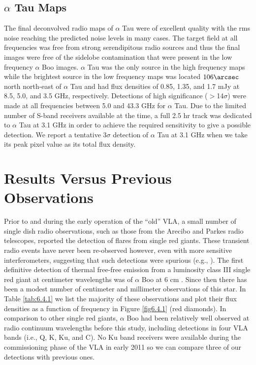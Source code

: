\subsection{$\alpha$ Tau Maps}\label{sec:6.2.2}
The final deconvolved radio maps of $\alpha$ Tau were of excellent quality with the rms noise reaching the predicted noise levels in many cases. The target field at all frequencies was free from strong serendipitous radio sources and thus the final images were free of the sidelobe contamination that were present in the low frequency $\alpha$ Boo images. $\alpha$ Tau was the only source in the high frequency maps while the brightest source in the low frequency maps was located $106\arcsec$ north north-east of $\alpha$ Tau and had flux densities of 0.85, 1.35, and 1.7 mJy at 8.5, 5.0, and 3.5 GHz, respectively. Detections of high significance ($>$14$\sigma$) were made at all frequencies between 5.0 and 43.3 GHz for $\alpha$ Tau. Due to the limited number of S-band receivers available at the time, a full 2.5 hr track was dedicated to $\alpha$ Tau at 3.1 GHz in order to achieve the required sensitivity to give a possible detection. We report a tentative $3\sigma$ detection of $\alpha$ Tau at 3.1 GHz when we take its peak pixel value as its total flux density.

\section{Results Versus Previous Observations}\label{sec:6.4}
Prior to and during the early operation of the ``old'' VLA, a small number of single dish radio observations, such as those from the Arecibo \citep{boice_1981} and Parkes \citep{slee_1989} radio telescopes, reported the detection of flares from single red giants. These transient radio events have never been re-observed however, even with more sensitive interferometers, suggesting that such detections were spurious (e.g., \citealt{beasley_1992}). The first definitive detection of thermal free-free emission from a luminosity class III single red giant at centimeter wavelengths was of $\alpha$ Boo at 6 cm \citep{drake_1983,drake_1986}. Since then there has been a modest number of centimeter and millimeter observations of this star. In Table \ref{tab:6.4.1} we list the majority of these observations and plot their flux densities as a function of frequency in Figure \ref{fig6.4.1} (red diamonds). In comparison to other single red giants, $\alpha$ Boo had been relatively well observed at radio continuum wavelengths before this study, including detections in four VLA bands (i.e., Q, K, Ku, and C). No Ku band receivers were available during the commissioning phase of the VLA in early 2011 so we can compare three of our detections with previous ones.

